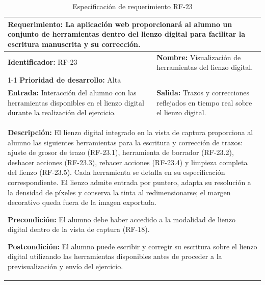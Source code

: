 \begin{table}[H]
\caption{Especificación de requerimiento RF-23}
\centering
\renewcommand{\arraystretch}{1.3}
\setlength{\tabcolsep}{6pt}
\begin{tabular}{|p{7cm}|p{8cm}|}
\hline
\multicolumn{2}{|p{15cm}|}{\textbf{Requerimiento:} La aplicación web proporcionará al alumno un conjunto de herramientas dentro del lienzo digital para facilitar la escritura manuscrita y su corrección.} \\ \hline
\textbf{Identificador:} RF-23 &
\textbf{Nombre:} Visualización de herramientas del lienzo digital. \\ \cline{1-1}
\textbf{Prioridad de desarrollo:} Alta &
\multicolumn{1}{p{8cm}|}{} \\ \hline
\textbf{Entrada:} Interacción del alumno con las herramientas disponibles en el lienzo digital durante la realización del ejercicio. &
\textbf{Salida:} Trazos y correcciones reflejados en tiempo real sobre el lienzo digital. \\ \hline
\multicolumn{2}{|p{15cm}|}{
\textbf{Descripción:} El lienzo digital integrado en la vista de captura proporciona al alumno las siguientes herramientas para la escritura y corrección de trazos: ajuste de grosor de trazo (RF-23.1), herramienta de borrador (RF-23.2), deshacer acciones (RF-23.3), rehacer acciones (RF-23.4) y limpieza completa del lienzo (RF-23.5). Cada herramienta se detalla en su especificación correspondiente. El lienzo admite entrada por puntero, adapta su resolución a la densidad de píxeles y conserva la tinta al redimensionarse; el margen decorativo queda fuera de la imagen exportada.

\vspace{0.2cm}
\textbf{Precondición:} El alumno debe haber accedido a la modalidad de lienzo digital dentro de la vista de captura (RF-18).

\vspace{0.2cm}
\textbf{Postcondición:} El alumno puede escribir y corregir su escritura sobre el lienzo digital utilizando las herramientas disponibles antes de proceder a la previsualización y envío del ejercicio.
} \\ \hline
\end{tabular}
\label{tab:rf23}
\end{table}

